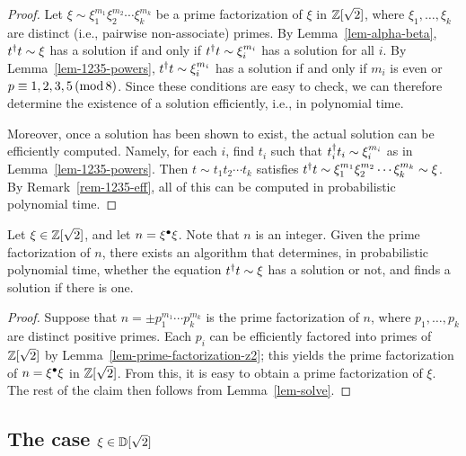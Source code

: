 \begin{proof}
  Let $\xi\sim \xi_1^{m_1}\xi_2^{m_2}\cdots\xi_k^{m_k}$ be a prime
  factorization of $\xi$ in $\mathbb{Z}[\sqrt2]$, where $\xi_1,\ldots,\xi_k$
  are distinct (i.e., pairwise non-associate) primes. By
  Lemma~\ref{lem-alpha-beta}, $t^{\dagger} t\sim\xi$ has a solution if and
  only if $t^{\dagger} t\sim\xi_i^{m_i}$ has a solution for all $i$.  By
  Lemma~\ref{lem-1235-powers}, $t^{\dagger} t\sim\xi_i^{m_i}$ has a solution
  if and only if $m_i$ is even or $p\equiv 1,2,3,5\,(\mathop{{\rm mod}}8)$. Since
  these conditions are easy to check, we can therefore determine the
  existence of a solution efficiently, i.e., in polynomial time.

  Moreover, once a solution has been shown to exist, the actual
  solution can be efficiently computed. Namely, for each $i$, find
  $t_i$ such that $t_i^{\dagger} t_i\sim\xi_i^{m_i}$ as in
  Lemma~\ref{lem-1235-powers}. Then $t\sim t_1t_2\cdots t_k$ satisfies
  $t^{\dagger} t\sim \xi_1^{m_1}\xi_2^{m_2}\cdots\xi_k^{m_k}\sim\xi$. By
  Remark~\ref{rem-1235-eff}, all of this can be computed in
  probabilistic polynomial time.
\end{proof}

\begin{proposition}\label{prop-diophantine}
  Let $\xi\in\mathbb{Z}[\sqrt2]$, and let $n=\xi^{\bullet}\xi$. Note that $n$ is an
  integer. Given the prime factorization of $n$, there exists an
  algorithm that determines, in probabilistic polynomial time, whether
  the equation $t^{\dagger} t\sim\xi$ has a solution or not, and finds a
  solution if there is one.
\end{proposition}

\begin{proof}
  Suppose that $n=\pm p_1^{m_1}\cdots p_k^{m_k}$ is the prime
  factorization of $n$, where $p_1,\ldots,p_k$ are distinct positive
  primes.  Each $p_i$ can be efficiently factored into primes of
  $\mathbb{Z}[\sqrt2]$ by Lemma~\ref{lem-prime-factorization-z2}; this yields
  the prime factorization of $n=\xi^{\bullet}\xi$ in $\mathbb{Z}[\sqrt2]$. From
  this, it is easy to obtain a prime factorization of $\xi$. The rest
  of the claim then follows from Lemma~\ref{lem-solve}.
\end{proof}

\subsection[{The case xi in D[root 2]}]
{The case $\xi\in{\mathbb{D}}[\sqrt 2]$}

